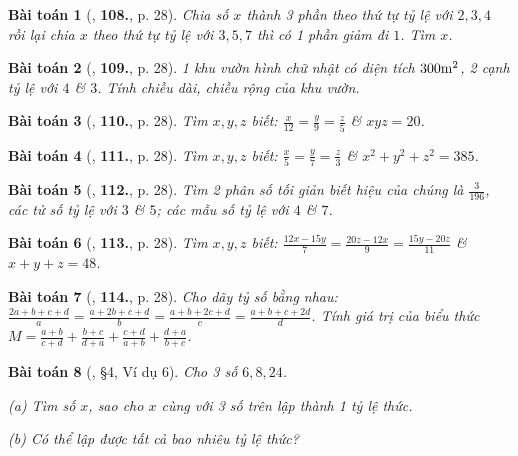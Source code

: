 \documentclass{article}
\numberwithin{equation}{section}
\newtheorem{baitoan}{Bài toán}
\begin{document}
\begin{baitoan}[\cite{Tuyen_Toan_7}, \textbf{108.}, p. 28]
	Chia số $x$ thành 3 phần theo thứ tự tỷ lệ với $2,3,4$ rồi lại chia $x$ theo thứ tự tỷ lệ với $3,5,7$ thì có 1 phần giảm đi $1$. Tìm $x$.
\end{baitoan}

\begin{baitoan}[\cite{Tuyen_Toan_7}, \textbf{109.}, p. 28]
	1 khu vườn hình chữ nhật có diện tích $\rm300m^2$, 2 cạnh tỷ lệ với $4$ \& $3$. Tính chiều dài, chiều rộng của khu vườn.
\end{baitoan}

\begin{baitoan}[\cite{Tuyen_Toan_7}, \textbf{110.}, p. 28]
	Tìm $x,y,z$ biết: $\frac{x}{12} = \frac{y}{9} = \frac{z}{5}$ \& $xyz = 20$.
\end{baitoan}

\begin{baitoan}[\cite{Tuyen_Toan_7}, \textbf{111.}, p. 28]
	Tìm $x,y,z$ biết: $\frac{x}{5} = \frac{y}{7} = \frac{z}{3}$ \& $x^2 + y^2 + z^2 = 385$.
\end{baitoan}

\begin{baitoan}[\cite{Tuyen_Toan_7}, \textbf{112.}, p. 28]
	Tìm 2 phân số tối giản biết hiệu của chúng là $\frac{3}{196}$, các tử số tỷ lệ với $3$ \& $5$; các mẫu số tỷ lệ với $4$ \& $7$.
\end{baitoan}

\begin{baitoan}[\cite{Tuyen_Toan_7}, \textbf{113.}, p. 28]
	Tìm $x,y,z$ biết: $\frac{12x - 15y}{7} = \frac{20z - 12x}{9} = \frac{15y - 20z}{11}$ \& $x + y + z = 48$.
\end{baitoan}

\begin{baitoan}[\cite{Tuyen_Toan_7}, \textbf{114.}, p. 28]
	Cho dãy tỷ số bằng nhau: $\frac{2a + b + c + d}{a} = \frac{a + 2b + c + d}{b} = \frac{a + b + 2c + d}{c} = \frac{a + b + c + 2d}{d}$. Tính giá trị của biểu thức $M = \frac{a + b}{c + d} + \frac{b + c}{d + a} + \frac{c + d}{a + b} + \frac{d + a}{b + c}$.
\end{baitoan}

\begin{baitoan}[\cite{Binh_Toan_7_tap_1}, \S4, Ví dụ 6]
	Cho 3 số $6,8,24$.
	\begin{enumerate*}
		\item[(a)] Tìm số $x$, sao cho $x$ cùng với 3 số trên lập thành 1 tỷ lệ thức.
		\item[(b)] Có thể lập được tất cả bao nhiêu tỷ lệ thức?
	\end{enumerate*}
\end{baitoan}
\end{document}
